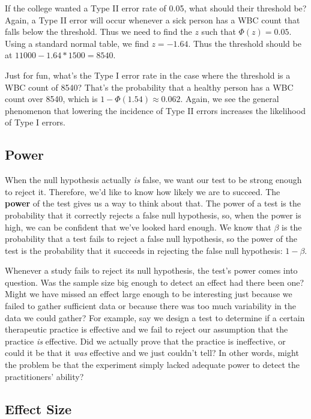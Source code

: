 If the college wanted a Type II error rate of 0.05, what should their threshold be?  Again, a Type II error will occur whenever a sick person has a WBC count that falls below the threshold.  Thus we need to find the $z$ such that $\Phi(z)=0.05$.  Using a standard normal table, we find $z = -1.64$.  Thus the threshold should be at $11000 - 1.64*1500 = 8540$.

Just for fun, what's the Type I error rate in the case where the threshold is a WBC count of 8540?  That's the probability that a healthy person has a WBC count over 8540, which is $1-\Phi(1.54)\approx 0.062$.  Again, we see the general phenomenon that lowering the incidence of Type II errors increases the likelihood of Type I errors.

\subsection{Power} \label{sec:Power}

When the null hypothesis actually \emph{is} false, we want our test to be strong enough to reject it. Therefore, we'd like to know how likely we are to succeed. The \textbf{power} of the test gives us a way to think about that. The power of a test is the probability that it correctly rejects a false null hypothesis, so, when the power is high, we can be confident that we've looked hard enough. We know that $\beta$ is the probability that a test fails to reject a false null hypothesis, so the power of the test is the probability that it succeeds in rejecting the false null hypothesis: $1 - \beta$.

Whenever a study fails to reject its null hypothesis, the test's power comes into question. Was the sample size big enough to detect an effect had there been one? Might we have missed an effect large enough to be interesting just because we failed to gather sufficient data or because there was too much variability in the data we could gather? For example, say we design a test to determine if a certain therapeutic practice is effective and we fail to reject our assumption that the practice \emph{is} effective. Did we actually prove that the practice is ineffective, or could it be that it \emph{was} effective and we just couldn't tell? In other words, might the problem be that the experiment simply lacked adequate power to detect the practitioners' ability? 

\subsection{Effect Size} \label{sec:Effect Size}

